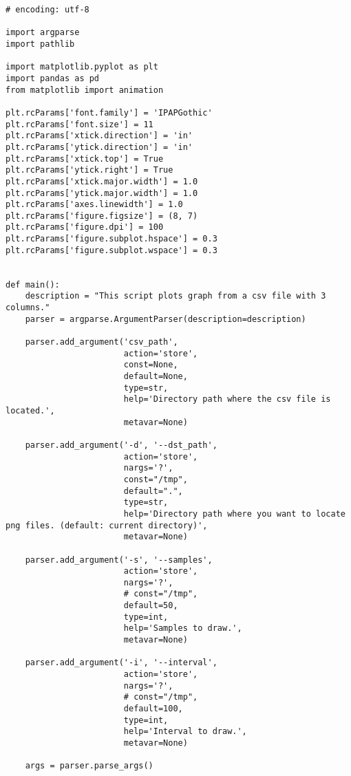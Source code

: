 \begin{lstlisting}[caption=plot\_animation\_from\_csv.py,label=plot\_animation\_from\_csv.py]
# encoding: utf-8

import argparse
import pathlib

import matplotlib.pyplot as plt
import pandas as pd
from matplotlib import animation

plt.rcParams['font.family'] = 'IPAPGothic'
plt.rcParams['font.size'] = 11
plt.rcParams['xtick.direction'] = 'in'
plt.rcParams['ytick.direction'] = 'in'
plt.rcParams['xtick.top'] = True
plt.rcParams['ytick.right'] = True
plt.rcParams['xtick.major.width'] = 1.0
plt.rcParams['ytick.major.width'] = 1.0
plt.rcParams['axes.linewidth'] = 1.0
plt.rcParams['figure.figsize'] = (8, 7)
plt.rcParams['figure.dpi'] = 100
plt.rcParams['figure.subplot.hspace'] = 0.3
plt.rcParams['figure.subplot.wspace'] = 0.3


def main():
    description = "This script plots graph from a csv file with 3 columns."
    parser = argparse.ArgumentParser(description=description)

    parser.add_argument('csv_path',
                        action='store',
                        const=None,
                        default=None,
                        type=str,
                        help='Directory path where the csv file is located.',
                        metavar=None)

    parser.add_argument('-d', '--dst_path',
                        action='store',
                        nargs='?',
                        const="/tmp",
                        default=".",
                        type=str,
                        help='Directory path where you want to locate png files. (default: current directory)',
                        metavar=None)

    parser.add_argument('-s', '--samples',
                        action='store',
                        nargs='?',
                        # const="/tmp",
                        default=50,
                        type=int,
                        help='Samples to draw.',
                        metavar=None)

    parser.add_argument('-i', '--interval',
                        action='store',
                        nargs='?',
                        # const="/tmp",
                        default=100,
                        type=int,
                        help='Interval to draw.',
                        metavar=None)

    args = parser.parse_args()


\end{lstlisting}
